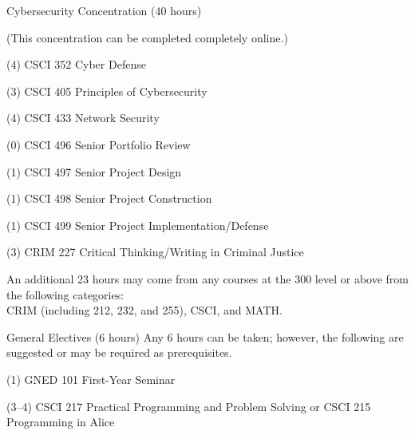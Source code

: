 \begin{reqgroup}{Cybersecurity Concentration (40 hours)}
\begin{center}%
(This concentration can be completed completely online.)\vspace{-0.5em}%
\end{center}%
\begin{checklist}
\begin{minipage}[t]{0.5\linewidth}
	\item (4) CSCI 352 Cyber Defense
	\item (3) CSCI 405 Principles of Cybersecurity
	\item (4) CSCI 433 Network Security
	\item (0) CSCI 496 Senior Portfolio Review
\end{minipage}
\begin{minipage}[t]{0.5\linewidth}
	\item (1) CSCI 497 Senior Project Design
	\item (1) CSCI 498 Senior Project Construction
	\item (1) CSCI 499 Senior Project Implementation/Defense
	\item (3) CRIM 227 Critical Thinking/Writing in Criminal Justice
\end{minipage}
\end{checklist}

\tcblower

An additional 23 hours may come from any courses at the 300 level or above from the following categories:\\CRIM (including 212, 232, and 255), CSCI, and MATH.
\begin{checklist}
\begin{minipage}[t]{0.5\linewidth}
	\blankReq
	\blankReq
	\blankReq
	\blankReq
\end{minipage}
\begin{minipage}[t]{0.5\linewidth}
	\blankReq
	\blankReq
	\blankReq
	\blankReq
\end{minipage}
\end{checklist}
\end{reqgroup}

\begin{reqgroup}{General Electives (6 hours)}
Any 6 hours can be taken; however, the following are suggested or may be required as prerequisites.
\begin{checklist}
\begin{minipage}[t]{\linewidth}
	\item (1)	GNED 101	First-Year Seminar
	\item (3--4)	CSCI 217	Practical Programming and Problem Solving or CSCI 215	Programming in Alice%
		\blankReq{}
\end{minipage}
\end{checklist}
\end{reqgroup}

